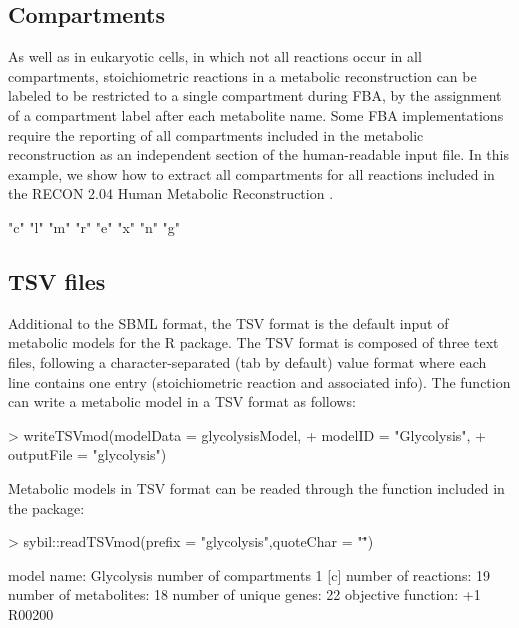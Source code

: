 \subsection{Compartments}
As well as in eukaryotic cells, in which not all reactions occur in all compartments,  stoichiometric reactions in a metabolic reconstruction can be labeled to be restricted to a single compartment during FBA, by the assignment of a compartment label after each metabolite name. Some FBA implementations require the reporting of all compartments included in the metabolic reconstruction as an independent section of the human-readable input file. In this example, we show how to extract all compartments for all reactions included in the RECON 2.04 Human Metabolic Reconstruction \citep{RECON2}.
\begin{Schunk}
\begin{Soutput}
[1] "c" "l" "m" "r" "e" "x" "n" "g"
\end{Soutput}
\end{Schunk}

\subsection{TSV files}
Additional to the SBML format, the TSV format is the default input of metabolic models for the  R package. The TSV format is composed of three text files, following a character-separated (tab by default) value format where each line contains one entry (stoichiometric reaction and associated info). The  function can write a metabolic model in a TSV format as follows:
\begin{Schunk}
\begin{Sinput}
> writeTSVmod(modelData = glycolysisModel,
+           modelID = "Glycolysis",
+           outputFile = "glycolysis")
\end{Sinput}
\end{Schunk}
Metabolic models in TSV format can be readed through the  function included in the  package:
\begin{Schunk}
\begin{Sinput}
> sybil::readTSVmod(prefix = "glycolysis",quoteChar = "\"")
\end{Sinput}
\begin{Soutput}
model name:             Glycolysis 
number of compartments  1 
                        [c] 
number of reactions:    19 
number of metabolites:  18 
number of unique genes: 22 
objective function:     +1 R00200 
\end{Soutput}
\end{Schunk}
